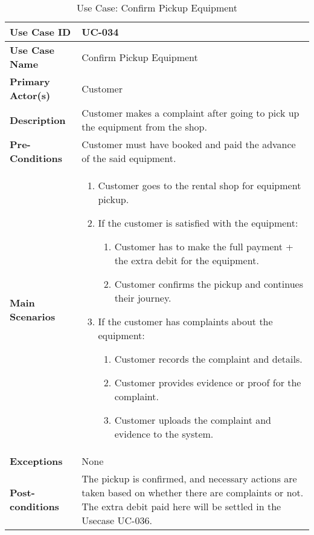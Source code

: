 \begin{table}[ht]
    \centering
    \begin{tabular}{|l|p{}|}
        \hline
        \textbf{Use Case ID} & UC-034 \\
        \hline
        \textbf{Use Case Name} & Confirm Pickup Equipment \\
        \hline
        \textbf{Primary Actor(s)} & Customer \\
        \hline
        \textbf{Description} & Customer makes a complaint after going to pick up the equipment from the shop. \\
        \hline
        \textbf{Pre-Conditions} & Customer must have booked and paid the advance of the said equipment. \\
        \hline
        \textbf{Main Scenarios} & 
        \begin{enumerate}[label=\arabic*.,itemsep=0pt]
            \item Customer goes to the rental shop for equipment pickup.
            \item If the customer is satisfied with the equipment:
                \begin{enumerate}[label=\alph*.,itemsep=0pt]
                    \item  Customer has to make the full payment + the extra debit for the equipment.
                    \item Customer confirms the pickup and continues their journey.
                \end{enumerate}
            \item If the customer has complaints about the equipment:
                \begin{enumerate}[label=\alph*.,itemsep=0pt]
                    \item Customer records the complaint and details.
                    \item Customer provides evidence or proof for the complaint.
                    \item Customer uploads the complaint and evidence to the system.
                \end{enumerate}
        \end{enumerate} \\
        \hline
        \textbf{Exceptions} & None \\
        \hline
        \textbf{Post-conditions} & The pickup is confirmed, and necessary actions are taken based on whether there are complaints or not.
        \break The extra debit paid here will be settled in the Usecase UC-036. \\
        \hline
    \end{tabular}
    \label{tab:use-case-confirm-pickup-equipment}
    \caption{Use Case: Confirm Pickup Equipment}
\end{table}



